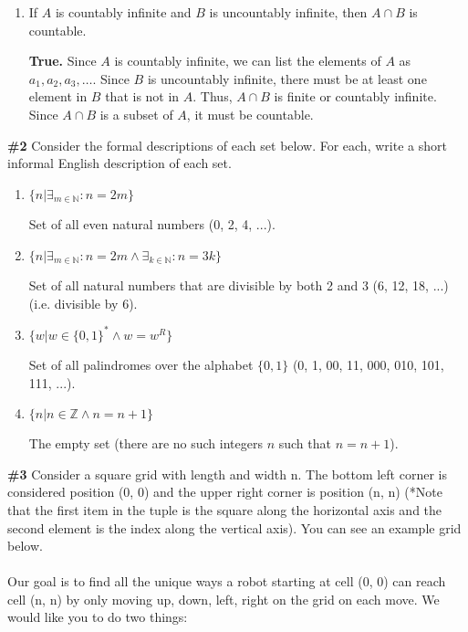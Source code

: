 \documentclass{article}
\newcommand{\problem}[1]{\textbf{\##1}}
\newcommand{\prob}[1]{\problem{#1}}
\newcommand{\AllIntegers}{\mathbb{Z}}
\newcommand{\AllNaturals}{\mathbb{N}}
\begin{document}
\begin{enumerate}
    \item If \(A\) is countably infinite and \(B\) is uncountably infinite, then \(A \cap B\) is countable.
    
    \textbf{True.} Since \(A\) is countably infinite, we can list the elements of \(A\) as \(a_1, a_2, a_3, \ldots\). Since \(B\) is uncountably infinite, there must be at least one element in \(B\) that is not in \(A\). Thus, \(A \cap B\) is finite or countably infinite. Since \(A \cap B\) is a subset of \(A\), it must be countable.
\end{enumerate}

\pagebreak

\prob{2} Consider the formal descriptions of each set below. For each, write a short informal English
description of each set.

\begin{enumerate}
    \item \(\{n|\exists_{m\in\AllNaturals}:n=2m\}\)
    
    Set of all even natural numbers (0, 2, 4, ...).

    \item \(\{n|\exists_{m\in\AllNaturals}:n=2m\wedge\exists_{k\in\AllNaturals}:n=3k\}\)
    
    Set of all natural numbers that are divisible by both 2 and 3 (6, 12, 18, ...) (i.e. divisible by 6).

    \item \(\{w|w\in\{0,1\}^*\wedge w=w^R\}\)
    
    Set of all palindromes over the alphabet \(\{0, 1\}\) (0, 1, 00, 11, 000, 010, 101, 111, ...).
    
    \item \(\{n|n\in\AllIntegers\wedge n=n+1\}\)

    The empty set (there are no such integers \(n\) such that \(n=n+1\)).

\end{enumerate}

\pagebreak

\prob{3} Consider a square grid with length and width n. The bottom left corner is considered position (0, 0) and the upper right corner is position (n, n) (*Note that the first item in the tuple is the square along the horizontal axis and the second element is the index along the vertical axis). You can see an example grid below.\\
\\
Our goal is to find all the unique ways a robot starting at cell (0, 0) can reach cell (n, n) by only moving up, down, left, right on the grid on each move. We would like you to do two things:
\end{document}
